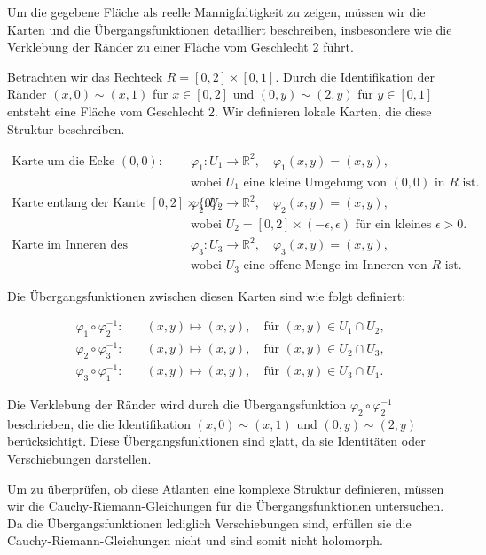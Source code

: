 Um die gegebene Fläche als reelle Mannigfaltigkeit zu zeigen, müssen wir die Karten und die Übergangsfunktionen detailliert beschreiben, insbesondere wie die Verklebung der Ränder zu einer Fläche vom Geschlecht 2 führt.

Betrachten wir das Rechteck $R = [0, 2] \times [0, 1]$. Durch die Identifikation der Ränder $(x, 0) \sim (x, 1)$ für $x \in [0, 2]$ und $(0, y) \sim (2, y)$ für $y \in [0, 1]$ entsteht eine Fläche vom Geschlecht 2. Wir definieren lokale Karten, die diese Struktur beschreiben.

\begin{align*}
\text{Karte um die Ecke } (0,0): \quad & \varphi_1: U_1 \to \mathbb{R}^2, \quad \varphi_1(x,y) = (x,y), \\
& \text{wobei } U_1 \text{ eine kleine Umgebung von } (0,0) \text{ in } R \text{ ist.} \\
\text{Karte entlang der Kante } [0,2] \times \{0\}: \quad & \varphi_2: U_2 \to \mathbb{R}^2, \quad \varphi_2(x,y) = (x,y), \\
& \text{wobei } U_2 = [0,2] \times (-\epsilon, \epsilon) \text{ für ein kleines } \epsilon > 0. \\
\text{Karte im Inneren des Rechtecks:} \quad & \varphi_3: U_3 \to \mathbb{R}^2, \quad \varphi_3(x,y) = (x,y), \\
& \text{wobei } U_3 \text{ eine offene Menge im Inneren von } R \text{ ist.}
\end{align*}

Die Übergangsfunktionen zwischen diesen Karten sind wie folgt definiert:

\begin{align*}
\varphi_1 \circ \varphi_2^{-1}: \quad & (x,y) \mapsto (x,y), \quad \text{für } (x,y) \in U_1 \cap U_2, \\
\varphi_2 \circ \varphi_3^{-1}: \quad & (x,y) \mapsto (x,y), \quad \text{für } (x,y) \in U_2 \cap U_3, \\
\varphi_3 \circ \varphi_1^{-1}: \quad & (x,y) \mapsto (x,y), \quad \text{für } (x,y) \in U_3 \cap U_1.
\end{align*}

Die Verklebung der Ränder wird durch die Übergangsfunktion $\varphi_2 \circ \varphi_2^{-1}$ beschrieben, die die Identifikation $(x, 0) \sim (x, 1)$ und $(0, y) \sim (2, y)$ berücksichtigt. Diese Übergangsfunktionen sind glatt, da sie Identitäten oder Verschiebungen darstellen.

Um zu überprüfen, ob diese Atlanten eine komplexe Struktur definieren, müssen wir die Cauchy-Riemann-Gleichungen für die Übergangsfunktionen untersuchen. Da die Übergangsfunktionen lediglich Verschiebungen sind, erfüllen sie die Cauchy-Riemann-Gleichungen nicht und sind somit nicht holomorph.

